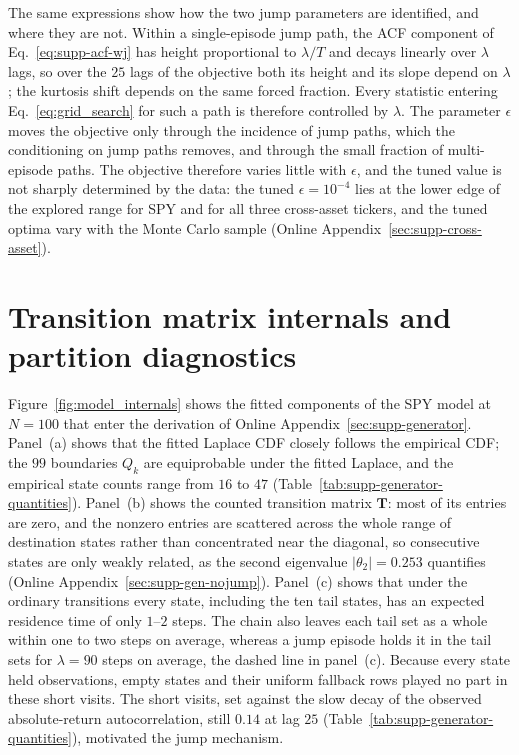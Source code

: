 The same expressions show how the two jump parameters are identified,
and where they are not. Within a single-episode jump path, the ACF
component of Eq.~\eqref{eq:supp-acf-wj} has height proportional to
$\lambda / T$ and decays linearly over $\lambda$ lags, so over the
$25$ lags of the objective both its height and its slope depend on
$\lambda$; the kurtosis shift depends on the same forced fraction.
Every statistic entering Eq.~\eqref{eq:grid_search} for such a path
is therefore controlled by $\lambda$. The parameter $\epsilon$ moves
the objective only through the incidence of jump paths, which the
conditioning on jump paths removes, and through the small fraction of
multi-episode paths. The objective therefore varies little with
$\epsilon$, and the tuned value is not sharply determined by the
data: the tuned $\epsilon = 10^{-4}$ lies at the lower edge of the
explored range for SPY and for all three cross-asset tickers, and the
tuned optima vary with the Monte Carlo sample (Online
Appendix~\ref{sec:supp-cross-asset}).


\section{Transition matrix internals and partition diagnostics}
\label{sec:supp-transitions}

Figure~\ref{fig:model_internals} shows the fitted components of the
SPY model at $N=100$ that enter the derivation of Online
Appendix~\ref{sec:supp-generator}. Panel~(a) shows that the fitted
Laplace CDF closely follows the empirical CDF; the $99$ boundaries
$Q_k$ are equiprobable under the fitted Laplace, and the empirical
state counts range from $16$ to $47$
(Table~\ref{tab:supp-generator-quantities}). Panel~(b) shows the
counted transition matrix $\mathbf{T}$: most of its entries are zero,
and the nonzero entries are scattered across the whole range of
destination states rather than concentrated near the diagonal, so
consecutive states are only weakly related, as the second eigenvalue
$|\theta_2| = 0.253$ quantifies (Online
Appendix~\ref{sec:supp-gen-nojump}). Panel~(c) shows that under the
ordinary transitions every state, including the ten tail states, has
an expected residence time of only $1$--$2$ steps. The chain also
leaves each tail set as a whole within one to two steps on average,
whereas a jump episode holds it in the tail sets for $\lambda = 90$
steps on average, the dashed line in panel~(c). Because every state
held observations, empty states and their uniform fallback rows
played no part in these short visits. The short visits, set against
the slow decay of the observed absolute-return autocorrelation, still
$0.14$ at lag $25$ (Table~\ref{tab:supp-generator-quantities}),
motivated the jump mechanism.

